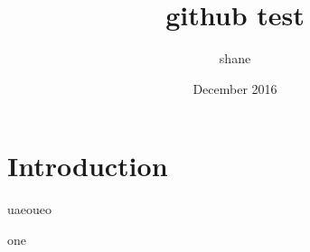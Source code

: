 \documentclass{article}
\title{github test}
\author{shane }
\date{December 2016}
\begin{document}
\maketitle

\section{Introduction}

uaeoueo

one
\end{document}
